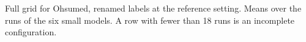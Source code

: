 \begin{table}[t]
  \centering
  \footnotesize
  
  \caption{Full grid for Ohsumed, renamed labels at the reference setting. Means over the runs of the six small models. A row with fewer than 18 runs is an incomplete configuration.}
  \label{tab:grid_ohsumed_relabel}
\end{table}
